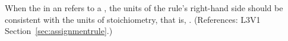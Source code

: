 When the  in an \AssignmentRule refers to a \SpeciesReference, the
units of the rule's right-hand side should be consistent with the units of stoichiometry,
that is, .  (References: L3V1 Section~\ref{sec:assignmentrule}.)
